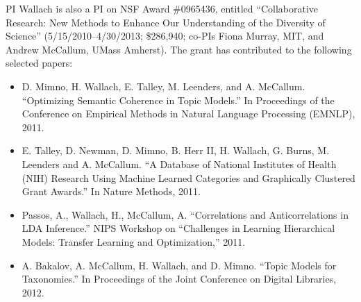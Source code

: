 


PI Wallach is also a PI on NSF Award \#0965436, entitled
``Collaborative Research: New Methods to Enhance Our Understanding of
the Diversity of Science'' (5/15/2010--4/30/2013; \$286,940; co-PIs
Fiona Murray, MIT, and Andrew McCallum, UMass Amherst). The grant has
contributed to the following selected papers:

\begin{itemize}

\item D. Mimno, H. Wallach, E. Talley, M. Leenders, and
  A. McCallum. ``Optimizing Semantic Coherence in Topic Models.'' In
  Proceedings of the Conference on Empirical Methods in Natural
  Language Processing (EMNLP), 2011.

\item E. Talley, D. Newman, D. Mimno, B. Herr II, H. Wallach,
  G. Burns, M. Leenders and A. McCallum. ``A Database of National
  Institutes of Health (NIH) Research Using Machine Learned Categories
  and Graphically Clustered Grant Awards.'' In Nature Methods, 2011.

\item Passos, A., Wallach, H., McCallum, A. ``Correlations and
  Anticorrelations in LDA Inference.'' NIPS Workshop on ``Challenges
  in Learning Hierarchical Models: Transfer Learning and
  Optimization,'' 2011.

\item A. Bakalov, A. McCallum, H. Wallach, and D. Mimno. ``Topic
  Models for Taxonomies.'' In Proceedings of the Joint Conference on
  Digital Libraries, 2012.

\end{itemize}

